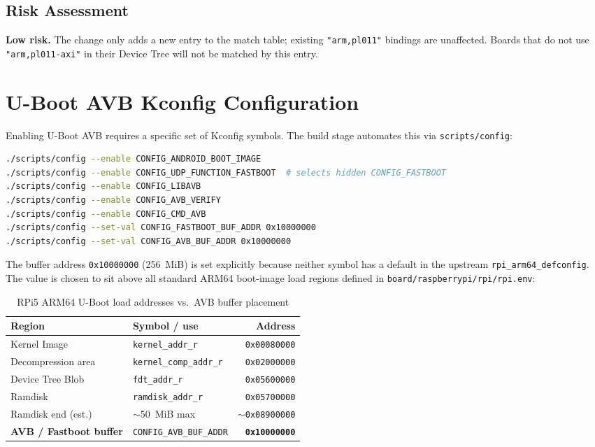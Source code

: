 \subsection{Risk Assessment}

\textbf{Low risk.} The change only adds a new entry to the match table; existing \texttt{"arm,pl011"} bindings are unaffected. Boards that do not use \texttt{"arm,pl011-axi"} in their Device Tree will not be matched by this entry.

\section{U-Boot AVB Kconfig Configuration}
\label{sec:impl_uboot_avb_kconfig}

Enabling U-Boot AVB requires a specific set of Kconfig symbols. The build stage automates this via \texttt{scripts/config}:

\begin{lstlisting}[language=bash, caption={Kconfig symbols enabled for AVB}]
./scripts/config --enable CONFIG_ANDROID_BOOT_IMAGE
./scripts/config --enable CONFIG_UDP_FUNCTION_FASTBOOT  # selects hidden CONFIG_FASTBOOT
./scripts/config --enable CONFIG_LIBAVB
./scripts/config --enable CONFIG_AVB_VERIFY
./scripts/config --enable CONFIG_CMD_AVB
./scripts/config --set-val CONFIG_FASTBOOT_BUF_ADDR 0x10000000
./scripts/config --set-val CONFIG_AVB_BUF_ADDR 0x10000000
\end{lstlisting}

The buffer address \texttt{0x10000000} (256~MiB) is set explicitly because neither symbol has a default in the upstream \texttt{rpi\_arm64\_defconfig}. The value is chosen to sit above all standard ARM64 boot-image load regions defined in \texttt{board/raspberrypi/rpi/rpi.env}:

\begin{table}[h]
\centering
\caption{RPi5 ARM64 U-Boot load addresses vs.\ AVB buffer placement}
\label{tab:uboot_mem}
\small
\begin{tabular}{llr}
\toprule
\textbf{Region} & \textbf{Symbol / use} & \textbf{Address} \\
\midrule
Kernel Image       & \texttt{kernel\_addr\_r}       & \texttt{0x00080000} \\
Decompression area & \texttt{kernel\_comp\_addr\_r} & \texttt{0x02000000} \\
Device Tree Blob   & \texttt{fdt\_addr\_r}          & \texttt{0x05600000} \\
Ramdisk            & \texttt{ramdisk\_addr\_r}      & \texttt{0x05700000} \\
Ramdisk end (est.) & $\sim$50~MiB max               & \texttt{$\sim$0x08900000} \\
\midrule
\textbf{AVB / Fastboot buffer} & \texttt{CONFIG\_AVB\_BUF\_ADDR} & \textbf{\texttt{0x10000000}} \\
\bottomrule
\end{tabular}
\end{table}

